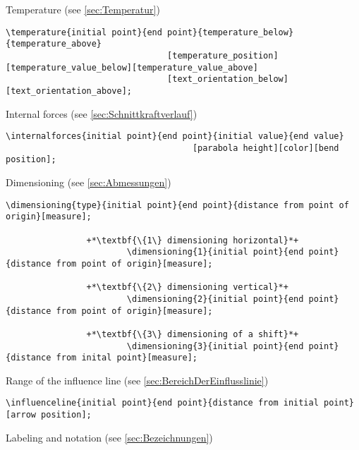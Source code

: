 \documentclass[%
  a4paper,
  BCOR20mm,
  pointlessnumbers,
  twoside,
  halfparskip,
  openright,
]{scrreprt}
\begin{document}
Temperature (see \ref{sec:Temperatur})

\begin{lstlisting}[emph={temperature},backgroundcolor=\color{white}]
		\temperature{initial point}{end point}{temperature_below}{temperature_above}
								[temperature_position][temperature_value_below][temperature_value_above]
								[text_orientation_below][text_orientation_above];
\end{lstlisting}\vspace{-10mm}

Internal forces (see \ref{sec:Schnittkraftverlauf})

\begin{lstlisting}[emph={internalforces},backgroundcolor=\color{white}]
		\internalforces{initial point}{end point}{initial value}{end value}
							 		 [parabola height][color][bend position];
\end{lstlisting}\vspace{-10mm}

Dimensioning (see \ref{sec:Abmessungen})

\begin{lstlisting}[emph={dimensioning},backgroundcolor=\color{white}]
		\dimensioning{type}{initial point}{end point}{distance from point of origin}[measure];
		
				+*\textbf{\{1\} dimensioning horizontal}*+
						\dimensioning{1}{initial point}{end point}{distance from point of origin}[measure];
						
				+*\textbf{\{2\} dimensioning vertical}*+
						\dimensioning{2}{initial point}{end point}{distance from point of origin}[measure];
						
				+*\textbf{\{3\} dimensioning of a shift}*+
						\dimensioning{3}{initial point}{end point}{distance from inital point}[measure];
\end{lstlisting}\vspace{-10mm}

Range of the influence line (see \ref{sec:BereichDerEinflusslinie})

\begin{lstlisting}[emph={influenceline},backgroundcolor=\color{white}]
		\influenceline{initial point}{end point}{distance from initial point}[arrow position];
\end{lstlisting}\vspace{-10mm}

Labeling and notation (see \ref{sec:Bezeichnungen})
\end{document}
